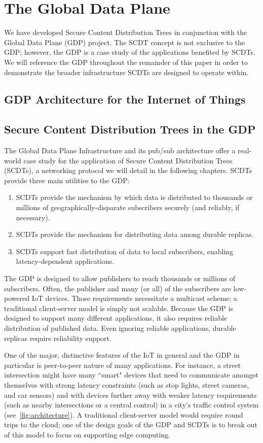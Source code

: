 \chapter{The Global Data Plane}
We have developed Secure Content Distribution Trees in conjunction with the Global Data Plane (GDP) project. The SCDT concept is not exclusive to the GDP; however, the GDP is a case study of the applications benefited by SCDTs. We will reference the GDP throughout the remainder of this paper in order to demonstrate the broader  infrastructure SCDTs are designed to operate within.

\section{GDP Architecture for the Internet of Things}
\label{gdp-arch}


\section{Secure Content Distribution Trees in the GDP}
\label{gdp-scdt}
The Global Data Plane Infrastructure and its pub/sub architecture offer a real-world case study for the application of Secure Content Distribution Trees (SCDTs), a networking protocol we will detail in the following chapters. SCDTs provide three main utilities to the GDP:

\begin{enumerate}  
	\item SCDTs provide the mechanism by which data is distributed to thousands or millions of geographically-disparate subscribers securely (and reliably, if necessary).
	\item SCDTs provide the mechanism for distributing data among durable replicas.
	\item SCDTs support fast distribution of data to local subscribers, enabling latency-dependent applications.
\end{enumerate}

The GDP is designed to allow publishers to reach thousands or millions of subscribers. Often, the publisher and many (or all) of the subscribers are low-powered IoT devices. Those requirements necessitate a multicast scheme; a traditional client-server model is simply not scalable. Because the GDP is designed to support many different applications, it also requires reliable distribution of published data. Even ignoring reliable applications, durable replicas require reliability support.

One of the major, distinctive features of the IoT in general and the GDP in particular is peer-to-peer nature of many applications. For instance, a street intersection might have many ``smart" devices that need to communicate amongst themselves with strong latency constraints (such as stop lights, street cameras, and car sensors) and with devices further away with weaker latency requirements (such as nearby intersections or a central control) in a city's traffic control system (see~\autoref{fig:architecture}). A traditional client-server model would require round trips to the cloud; one of the design goals of the GDP and SCDTs is to break out of this model to focus on supporting edge computing.


